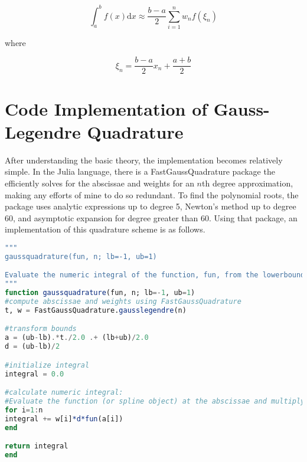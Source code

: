\[ \int_{a}^{b} f(x) \mathrm{d}x \approx \frac{b-a}{2} \sum_{i=1}^n w_n f(\xi_n) \]

where 

\[ \xi_n = \frac{b-a}{2}x_n + \frac{a+b}{2} \]

\section{Code Implementation of Gauss-Legendre Quadrature}
After understanding the basic theory, the implementation becomes relatively simple. In the Julia language, there is a FastGaussQuadrature package the efficiently solves for the abscissae and weights for an $n$th degree approximation, making any efforts of mine to do so redundant. To find the polynomial roots, the package uses analytic expressions up to degree 5, Newton's method up to degree 60, and asymptotic expansion for degree greater than 60. Using that package, an implementation of this quadrature scheme is as follows.

\begin{lstlisting}[language=julia]
"""
gaussquadrature(fun, n; lb=-1, ub=1)

Evaluate the numeric integral of the function, fun, from the lowerbound, lb, to the upper bound, ub, using an n-th degree Gauss-Legendre quadrature rule.
"""
function gaussquadrature(fun, n; lb=-1, ub=1)
#compute abscissae and weights using FastGaussQuadrature
t, w = FastGaussQuadrature.gausslegendre(n)

#transform bounds
a = (ub-lb).*t./2.0 .+ (lb+ub)/2.0
d = (ub-lb)/2

#initialize integral
integral = 0.0

#calculate numeric integral:
#Evaluate the function (or spline object) at the abscissae and multiply by the weights; sum the values together to obtain an estimate of the integral.
for i=1:n
integral += w[i]*d*fun(a[i])
end

return integral
end
\end{lstlisting}
